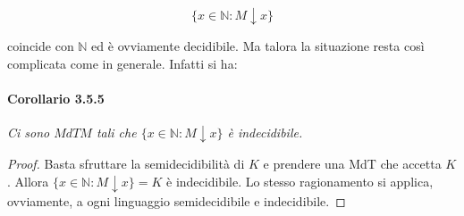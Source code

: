 \[
    \{x \in \mathbb{N}: M \downarrow x\}
\]

coincide con $\mathbb{N}$ ed è ovviamente decidibile. Ma talora la situazione
resta così complicata come in generale. Infatti si ha:

\paragraph{Corollario 3.5.5} \textit{Ci sono
    $M d T M$ tali che $\{x \in \mathbb{N}: M \downarrow x\}$ è indecidibile.}

\begin{proof}
    Basta sfruttare la semidecidibilità di $K$ e prendere una MdT che
    accetta $K$. Allora $\{x \in \mathbb{N}: M \downarrow x\}=K$ è indecidibile. Lo
    stesso ragionamento si applica, ovviamente, a ogni linguaggio semidecidibile e
    indecidibile.
\end{proof}